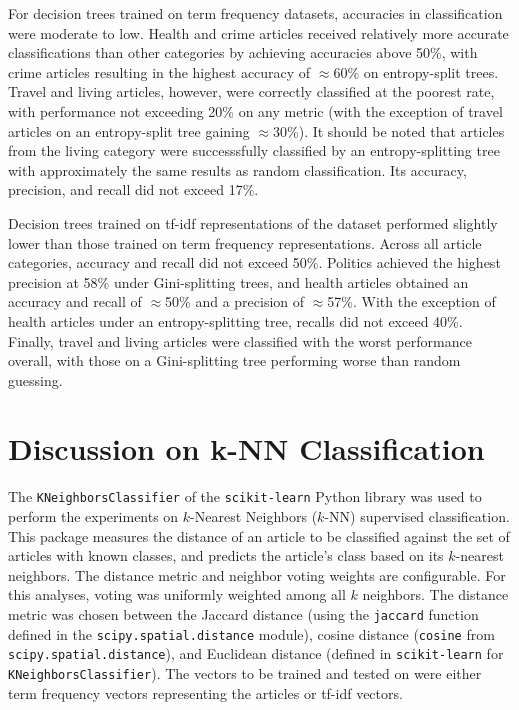 \documentclass[11pt]{article}
\begin{document}
For decision trees trained on term frequency datasets, accuracies in classification were moderate to low.
Health and crime articles received relatively more accurate classifications than other categories by achieving accuracies above 50\%, with crime articles resulting in the highest accuracy of $\approx$60\% on entropy-split trees.
Travel and living articles, however, were correctly classified at the poorest rate, with performance not exceeding 20\% on any metric (with the exception of travel articles on an entropy-split tree gaining $\approx$30\%).
It should be noted that articles from the living category were successsfully classified by an entropy-splitting tree with approximately the same results as random classification.
Its accuracy, precision, and recall did not exceed 17\%.

Decision trees trained on tf-idf representations of the dataset performed slightly lower than those trained on term frequency representations.
Across all article categories, accuracy and recall did not exceed 50\%.
Politics achieved the highest precision at 58\% under Gini-splitting trees, and health articles obtained an accuracy and recall of $\approx$50\% and a precision of $\approx$57\%.
With the exception of health articles under an entropy-splitting tree, recalls did not exceed 40\%.
Finally, travel and living articles were classified with the worst performance overall, with those on a Gini-splitting tree performing worse than random guessing.


\section{Discussion on k-NN Classification}

The \texttt{KNeighborsClassifier} of the \texttt{scikit-learn} Python library was used to perform the experiments on $k$-Nearest Neighbors ($k$-NN) supervised classification.
This package measures the distance of an article to be classified against the set of articles with known classes, and predicts the article's class based on its $k$-nearest neighbors.
The distance metric and neighbor voting weights are configurable.
For this analyses, voting was uniformly weighted among all $k$ neighbors.
The distance metric was chosen between the Jaccard distance (using the \texttt{jaccard} function defined in the \texttt{scipy.spatial.distance} module), cosine distance (\texttt{cosine} from \texttt{scipy.spatial.distance}), and Euclidean distance (defined in \texttt{scikit-learn} for \texttt{KNeighborsClassifier}).
The vectors to be trained and tested on were either term frequency vectors representing the articles or tf-idf vectors.
\end{document}
